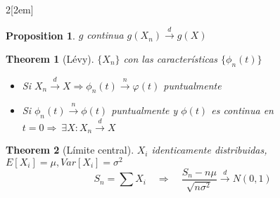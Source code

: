\documentclass[leqno]{article}
\newtheorem*{theorem}{Theorem}
\newtheorem*{proposition}{Proposition}
\begin{document}
\begin{multicols}{2}[\columnsep2em]
\begin{proposition} $g$ continua 
$g(X_n) \xrightarrow{d} g(X)$ 
\end{proposition}

\begin{theorem}[Lévy] $\{X_n\}$ con las características $\{\phi_n(t)\}$
  \begin{itemize}[topsep=-6pt, itemsep=0pt]
    \item Si $X_n\xrightarrow{d} X \Rightarrow \phi_n(t) \xrightarrow{n} \varphi(t)$ puntualmente
	\item Si $\phi_n(t) \xrightarrow{n} \phi (t)$ puntualmente y $\phi(t) $ es continua en $t=0 \Rightarrow \ \exists X : X_n\xrightarrow{d} X$
  \end{itemize}
\end{theorem}

\begin{theorem}[Límite central]
$X_i$ identicamente distribuidas, $E[X_i]=\mu, Var[X_i] = \sigma ^2$
\[
S_n = \sum X_i \quad \Rightarrow \quad \frac{S_n-n\mu}{\sqrt{n\sigma ^2} } \xrightarrow{d} N(0,1)
\] 
\end{theorem}





\end{multicols}
\end{document}
